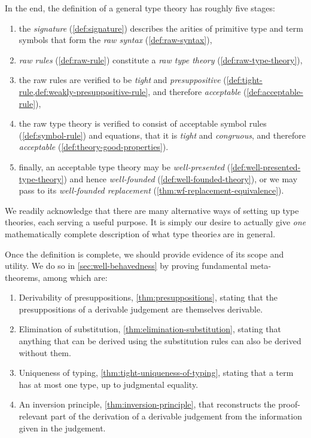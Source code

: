 In the end, the definition of a general type theory has roughly five stages:
%
\begin{enumerate}
\item the \emph{signature} (\cref{def:signature}) describes the arities of primitive type and term symbols that form the \emph{raw syntax} (\cref{def:raw-syntax}),
\item \emph{raw rules} (\cref{def:raw-rule}) constitute a \emph{raw type theory} (\cref{def:raw-type-theory}),
\item the raw rules are verified to be \emph{tight} and \emph{presuppositive} (\cref{def:tight-rule,def:weakly-presuppositive-rule}, and therefore \emph{acceptable} (\cref{def:acceptable-rule}),
\item the raw type theory is verified to consist of acceptable symbol rules (\cref{def:symbol-rule}) and equations, that it is \emph{tight} and \emph{congruous}, and therefore \emph{acceptable} (\cref{def:theory-good-properties}).
\item finally, an acceptable type theory may be \emph{well-presented} (\cref{def:well-presented-type-theory}) and hence \emph{well-founded} (\cref{def:well-founded-theory}), or we may pass to its \emph{well-founded replacement} (\cref{thm:wf-replacement-equivalence}).
\end{enumerate}

We readily acknowledge that there are many alternative ways of setting up type theories, each serving a useful purpose. It is simply our desire to actually give \emph{one} mathematically complete description of what type theorie\emph{s} are in general.

Once the definition is complete, we should provide evidence of its scope and utility. We do so in \cref{sec:well-behavedness} by proving fundamental meta-theorems, among which are:
%
\begin{enumerate}
\item Derivability of presuppositions, \cref{thm:presuppositions}, stating that the presuppositions of a derivable judgement are themselves derivable.
\item Elimination of substitution, \cref{thm:elimination-substitution}, stating that anything that can be derived using the substitution rules can also be derived without them.
\item Uniqueness of typing, \cref{thm:tight-uniqueness-of-typing}, stating that a term has at most one type, up to judgmental equality.
\item An inversion principle, \cref{thm:inversion-principle}, that reconstructs the proof-relevant part of the derivation of a derivable judgement from the information given in the judgement.
\end{enumerate}

